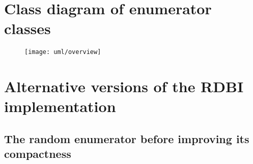 \chapter{Class diagram of enumerator classes}
\label{app:uml}

\begin{figure}[H]
    \centering
    \texttt{[image: uml/overview]}
\end{figure}

\chapter{Alternative versions of the RDBI implementation}

\section{The random enumerator before improving its compactness}
\label{app:random-not-compact}

